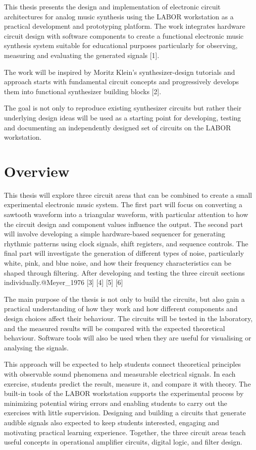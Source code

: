 \documentclass[
  11pt,
  a4paper,
  twoside]{scrbook}
\begin{document}
This thesis presents the design and implementation of electronic circuit
architectures for analog music synthesis using the LABOR workstation as
a practical development and prototyping platform. The work integrates
hardware circuit design with software components to create a functional
electronic music synthesis system suitable for educational purposes
particularly for observing, measuring and evaluating the generated
signals {[}1{]}.

The work will be inspired by Moritz Klein's synthesizer-design tutorials
and approach starts with fundamental circuit concepts and progressively
develops them into functional synthesizer building blocks {[}2{]}.

The goal is not only to reproduce existing synthesizer circuits but
rather their underlying design ideas will be used as a starting point
for developing, testing and documenting an independently designed set of
circuits on the LABOR workstation.

\section{Overview}\label{overview}

This thesis will explore three circuit areas that can be combined to
create a small experimental electronic music system. The first part will
focus on converting a sawtooth waveform into a triangular waveform, with
particular attention to how the circuit design and component values
influence the output. The second part will involve developing a simple
hardware-based sequencer for generating rhythmic patterns using clock
signals, shift registers, and sequence controls. The final part will
investigate the generation of different types of noise, particularly
white, pink, and blue noise, and how their frequency characteristics can
be shaped through filtering. After developing and testing the three
circuit sections individually.@Meyer\_1976 {[}3{]} {[}4{]} {[}5{]}
{[}6{]}

The main purpose of the thesis is not only to build the circuits, but
also gain a practical understanding of how they work and how different
components and design choices affect their behaviour. The circuits will
be tested in the laboratory, and the measured results will be compared
with the expected theoretical behaviour. Software tools will also be
used when they are useful for visualising or analysing the signals.

This approach will be expected to help students connect theoretical
principles with observable sound phenomena and measurable electrical
signals. In each exercise, students predict the result, measure it, and
compare it with theory. The built-in tools of the LABOR workstation
supports the experimental process by minimizing potential wiring errors
and enabling students to carry out the exercises with little
supervision. Designing and building a circuits that generate audible
signals also expected to keep students interested, engaging and
motivating practical learning experience. Together, the three circuit
areas teach useful concepts in operational amplifier circuits, digital
logic, and filter design.
\end{document}

